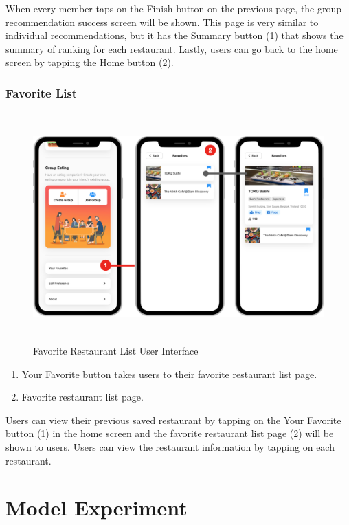 \documentclass[12pt,oneside,openright,a4paper]{cpe-english-project}
\begin{document}
When every member taps on the Finish button on the previous page, the group recommendation success screen will be shown. This page is very similar to individual recommendations, but it has the Summary button (1) that shows the summary of ranking for each restaurant. Lastly, users can go back to the home screen by tapping the Home button (2).

\newpage
\subsubsection{Favorite List}
\begin{figure}[H]\centering
\includegraphics[height=250pt]{./images/4ui_FavoriteRestaurantListUserInterface.png}
\caption{Favorite Restaurant List User Interface}\label{fig:4ui_FavoriteRestaurantListUserInterface}
\end{figure}

\begin{enumerate}
\item Your Favorite button takes users to their favorite restaurant list page.
\item Favorite restaurant list page.
\end{enumerate}

Users can view their previous saved restaurant by tapping on the Your Favorite button (1) in the home screen and the favorite restaurant list page (2) will be shown to users. Users can view the restaurant information by tapping on each restaurant.


\section{Model Experiment}
\end{document}
